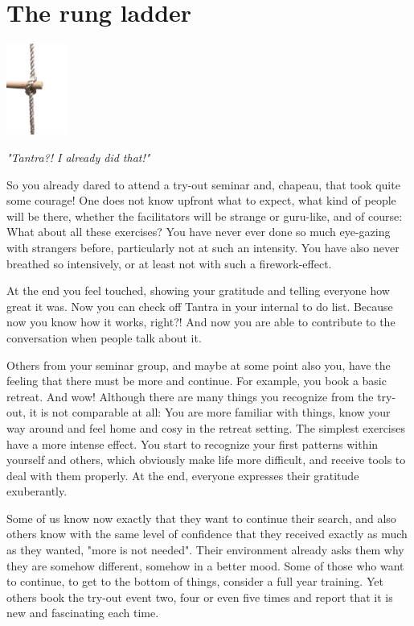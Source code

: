 \section{The rung ladder}

\begin{center}
\includegraphics[width=2cm]{images/04_ladder.png}
\end{center}

\textit{"Tantra?! I already did that!"}

So you already dared to attend a try-out seminar and, chapeau, that took quite some courage! One does not know upfront what to expect, what kind of people will be there, whether the facilitators will be strange or guru-like, and of course: What about all these exercises? You have never ever done so much eye-gazing with strangers before, particularly not  at such an intensity. You have also never breathed so intensively, or at least not with such a firework-effect.

At the end you feel touched, showing your gratitude and telling everyone how great it was. Now you can check off Tantra in your internal to do list. Because now you know how it works, right?! And now you are able to contribute to the conversation when people talk about it.

Others from your seminar group, and maybe at some point also you, have the feeling that there must be more and continue. For example, you book a basic retreat. And wow! Although there are many things you recognize from the try-out, it is not comparable at all: You are more familiar with things, know your way around and feel home and cosy in the retreat setting. The simplest exercises have a more intense effect. You start to recognize your first patterns within yourself and others, which obviously make life more difficult, and receive tools to deal with them properly. At the end, everyone expresses their gratitude exuberantly.

Some of us know now exactly that they want to continue their search, and also others know with the same level of confidence that they received exactly as much as they wanted, "more is not needed". Their environment already asks them why they are somehow different, somehow in a better mood. Some of those who want to continue, to get to the bottom of things, consider a full year training. Yet others book the try-out event two, four or even five times  and report that it is new and fascinating each time.


